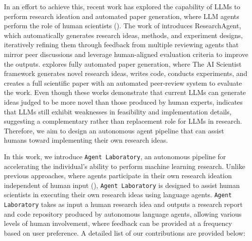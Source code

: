 \documentclass[11pt, a4paper]{gdm_format}
\begin{document}
In an effort to achieve this, recent work has explored the capability of LLMs to perform research ideation and automated paper generation, where LLM agents perform the role of human scientists (\cite{baek2024researchagent, lu2024ai, ghafarollahi2024sciagents, swanson2024virtual}). The work of \cite{baek2024researchagent} introduces ResearchAgent, which automatically generates research ideas, methods, and experiment designs, iteratively refining them through feedback from multiple reviewing agents that mirror peer discussions and leverage human-aligned evaluation criteria to improve the outputs. \cite{lu2024ai} explores fully automated paper generation, where The AI Scientist framework generates novel research ideas, writes code, conducts experiments, and creates a full scientific paper with an automated peer-review system to evaluate the work. Even though these works demonstrate that current LLMs can generate ideas judged to be more novel than those produced by human experts, \cite{si2024can} indicates that LLMs still exhibit weaknesses in feasibility and implementation details, suggesting a complementary rather than replacement role for LLMs in research. Therefore, we aim to design an autonomous agent pipeline that can assist humans toward implementing their own research ideas.




In this work, we introduce \texttt{Agent Laboratory}, an autonomous pipeline for accelerating the individual’s ability to perform machine learning research. Unlike previous approaches, where agents participate in their own research ideation independent of human input (\cite{lu2024aiscientist, baek2024researchagent}), \texttt{Agent Laboratory} is designed to assist human scientists in executing their own research ideas using language agents. \texttt{Agent Laboratory} takes as input a human research idea and outputs a research report and code repository produced by autonomous language agents, allowing various levels of human involvement, where feedback can be provided at a frequency based on user preference. A detailed list of our contributions are provided below:
\end{document}
